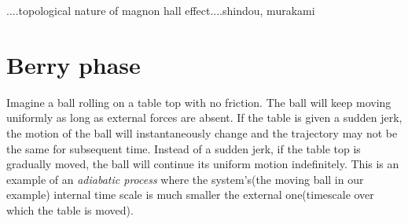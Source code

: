 ....topological nature of magnon hall effect....shindou, murakami

\section{Berry phase}
Imagine a ball rolling on a table top with no friction. The ball will keep moving uniformly as long as external forces are absent. If the table is given a sudden jerk, the motion of the ball will instantaneously change and the trajectory may not be the same for subsequent time. Instead of a sudden jerk, if the table top is gradually moved, the ball will continue its uniform motion indefinitely. This is an example of an \textit{adiabatic process} where the system's(the moving ball in our example) internal time scale is much smaller the external one(timescale over which the table is moved).


